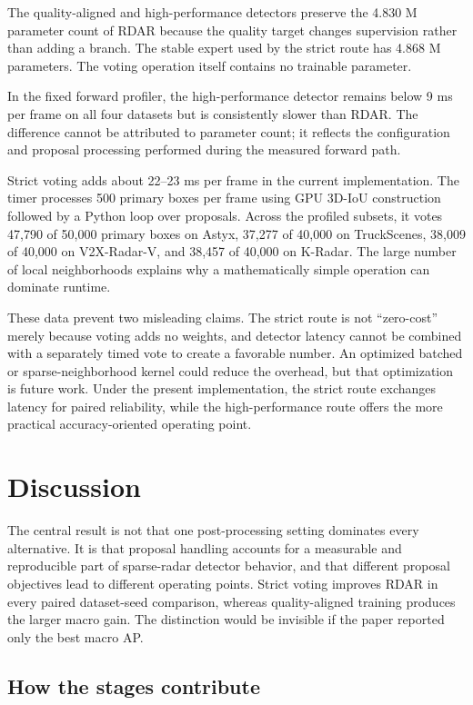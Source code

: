 \documentclass[preprint,12pt,times]{elsarticle}
\begin{document}
The quality-aligned and high-performance detectors preserve the 4.830 M
parameter count of RDAR because the quality target changes supervision rather
than adding a branch. The stable expert used by the strict route has 4.868 M
parameters. The voting operation itself contains no trainable parameter.

In the fixed forward profiler, the high-performance detector remains below
9 ms per frame on all four datasets but is consistently slower than RDAR. The
difference cannot be attributed to parameter count; it reflects the
configuration and proposal processing performed during the measured forward
path.

Strict voting adds about 22--23 ms per frame in the current implementation.
The timer processes 500 primary boxes per frame using GPU 3D-IoU construction
followed by a Python loop over proposals. Across the profiled subsets, it votes
47,790 of 50,000 primary boxes on Astyx, 37,277 of 40,000 on TruckScenes,
38,009 of 40,000 on V2X-Radar-V, and 38,457 of 40,000 on K-Radar. The large
number of local neighborhoods explains why a mathematically simple operation
can dominate runtime.

These data prevent two misleading claims. The strict route is not
``zero-cost'' merely because voting adds no weights, and detector latency
cannot be combined with a separately timed vote to create a favorable number.
An optimized batched or sparse-neighborhood kernel could reduce the overhead,
but that optimization is future work. Under the present implementation, the
strict route exchanges latency for paired reliability, while the
high-performance route offers the more practical accuracy-oriented operating
point.

\section{Discussion}

The central result is not that one post-processing setting dominates every
alternative. It is that proposal handling accounts for a measurable and
reproducible part of sparse-radar detector behavior, and that different
proposal objectives lead to different operating points. Strict voting improves
RDAR in every paired dataset-seed comparison, whereas quality-aligned training
produces the larger macro gain. The distinction would be invisible if the
paper reported only the best macro AP.

\subsection{How the stages contribute}
\end{document}
